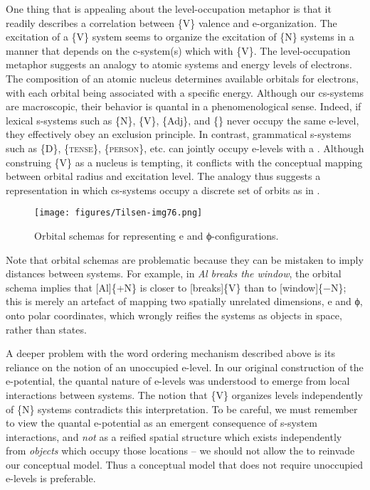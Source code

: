   One thing that is appealing about the level-occupation metaphor is that it readily describes a correlation between \{V\} valence and e-organization. The excitation of a \{V\} system seems to organize the excitation of \{N\} systems in a manner that depends on the c-system(s) which  with \{V\}. The level-occupation metaphor suggests an analogy to atomic systems and energy levels of electrons. The composition of an atomic nucleus determines available orbitals for electrons, with each orbital being associated with a specific energy. Although our cs-systems are macroscopic, their behavior is quantal in a phenomenological sense. Indeed, if lexical s-systems such as \{N\}, \{V\}, \{Adj\}, and \{\} never occupy the same e-level, they effectively obey an exclusion principle. In contrast, grammatical s-systems such as \{D\}, \{\textsc{tense}\}, \{\textsc{person}\}, etc. can jointly occupy e-levels with a . Although construing \{V\} as a nucleus is tempting, it conflicts with the conceptual mapping between orbital radius and excitation level. The analogy thus suggests a representation in which cs-systems occupy a discrete set of orbits as in {}.

  
\begin{figure}
\texttt{[image: figures/Tilsen-img76.png]}
\caption{Orbital schemas for representing e and ϕ-configurations.}
\label{fig:4:26}
\end{figure}
 

  Note that orbital schemas are problematic because they can be mistaken to imply distances between systems. For example, in \textit{Al breaks the window}, the orbital schema implies that [Al]\{+N\} is closer to [breaks]\{V\} than to [window]\{−N\}; this is merely an artefact of mapping two spatially unrelated dimensions, e and ϕ, onto polar coordinates, which wrongly reifies the systems as objects in space, rather than states.

  A deeper problem with the word ordering mechanism described above is its reliance on the notion of an unoccupied e-level. In our original construction of the e-potential, the quantal nature of e-levels was understood to emerge from local interactions between systems. The notion that \{V\} organizes levels independently of \{N\} systems contradicts this interpretation. To be careful, we must remember to view the quantal e-potential as an emergent consequence of s-system interactions, and \textit{not} as a reified spatial structure which exists independently from \textit{objects} which occupy those locations -- we should not allow the  to reinvade our conceptual model. Thus a conceptual model that does not require unoccupied e-levels is preferable.

